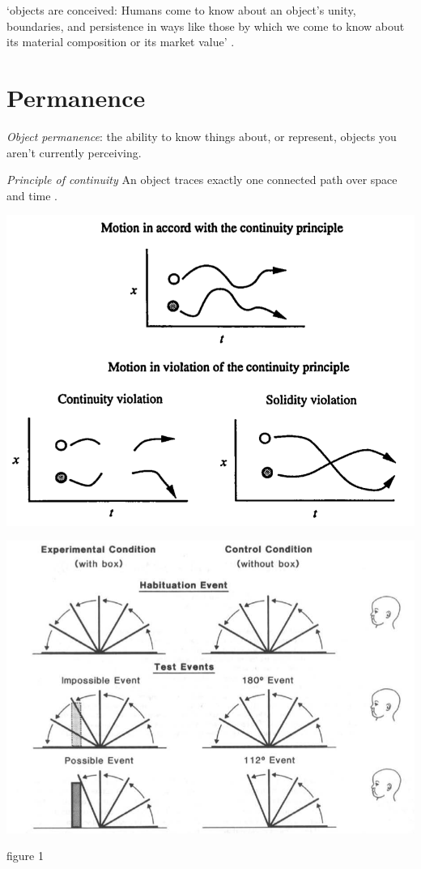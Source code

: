 \documentclass[12pt]{extarticle}
\begin{document}
\begin{multicols}{3}
‘objects are conceived: Humans come to know about an object’s unity, boundaries, and 
persistence in ways like those by which we come to know about its material composition or its 
market value’
\citep[p.\ 198]{Spelke:1988xc}.
 
 
 
\section{Permanence}
 
\textit{Object permanence}:
the ability to know things about, or represent, objects you aren't currently perceiving.
 
\emph{Principle of continuity}  An object traces exactly one connected path over space and time \citep[p.\ 113]{spelke:1995_spatiotemporal}.
 
\begin{center}
\includegraphics[scale=0.3]{img/spelke_1995_fig1.neg.png}
\end{center}
\begin{center}
\includegraphics[scale=0.3]{img/baillargeon_1987_fig1.neg.png}
\end{center}
\begin{center} \citealp{baillargeon:1987_object} figure 1 \end{center}
 

\end{multicols}
\end{document}
